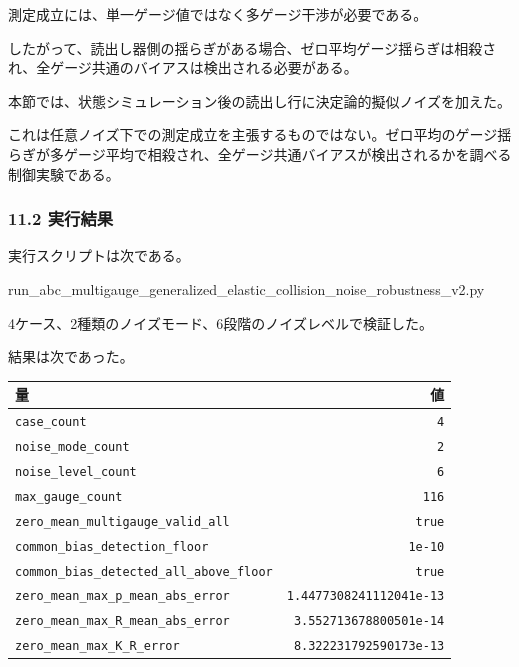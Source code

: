 \documentclass[
  a4paper,
]{article}
\newenvironment{Shaded}{}{}
\newcommand{\NormalTok}[1]{#1}
\newcounter{none} %
\begin{document}
測定成立には、単一ゲージ値ではなく多ゲージ干渉が必要である。

したがって、読出し器側の揺らぎがある場合、ゼロ平均ゲージ揺らぎは相殺され、全ゲージ共通のバイアスは検出される必要がある。

本節では、状態シミュレーション後の読出し行に決定論的擬似ノイズを加えた。

これは任意ノイズ下での測定成立を主張するものではない。ゼロ平均のゲージ揺らぎが多ゲージ平均で相殺され、全ゲージ共通バイアスが検出されるかを調べる制御実験である。

\subsubsection{11.2 実行結果}\label{ux5b9fux884cux7d50ux679c-3}

実行スクリプトは次である。

\begin{Shaded}
\begin{Highlighting}[]
\NormalTok{run\_abc\_multigauge\_generalized\_elastic\_collision\_noise\_robustness\_v2.py}
\end{Highlighting}
\end{Shaded}

4ケース、2種類のノイズモード、6段階のノイズレベルで検証した。

結果は次であった。

{\def\LTcaptype{none} %
\begin{longtable}[]{@{}lr@{}}
\toprule\noalign{}
量 & 値 \\
\midrule\noalign{}
\endhead
\bottomrule\noalign{}
\endlastfoot
\texttt{case\_count} & \texttt{4} \\
\texttt{noise\_mode\_count} & \texttt{2} \\
\texttt{noise\_level\_count} & \texttt{6} \\
\texttt{max\_gauge\_count} & \texttt{116} \\
\texttt{zero\_mean\_multigauge\_valid\_all} & \texttt{true} \\
\texttt{common\_bias\_detection\_floor} & \texttt{1e-10} \\
\texttt{common\_bias\_detected\_all\_above\_floor} & \texttt{true} \\
\texttt{zero\_mean\_max\_p\_mean\_abs\_error} &
\texttt{1.4477308241112041e-13} \\
\texttt{zero\_mean\_max\_R\_mean\_abs\_error} &
\texttt{3.552713678800501e-14} \\
\texttt{zero\_mean\_max\_K\_R\_error} &
\texttt{8.322231792590173e-13} \\
\end{longtable}
}
\end{document}
